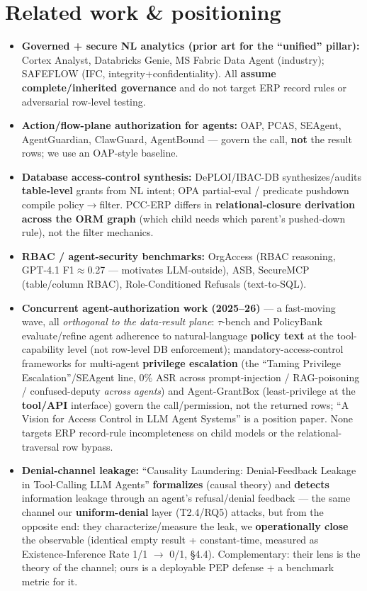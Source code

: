 \documentclass[11pt,a4paper]{article}
\begin{document}
\section{Related work \& positioning}
\begin{itemize}[leftmargin=*]
  \item \textbf{Governed + secure NL analytics (prior art for the ``unified'' pillar):} Cortex Analyst,
        Databricks Genie, MS Fabric Data Agent (industry); SAFEFLOW (IFC, integrity+confidentiality). All
        \textbf{assume complete/inherited governance} and do not target ERP record rules or adversarial
        row-level testing.
  \item \textbf{Action/flow-plane authorization for agents:} OAP, PCAS, SEAgent, AgentGuardian, ClawGuard,
        AgentBound --- govern the call, \textbf{not} the result rows; we use an OAP-style baseline.
  \item \textbf{Database access-control synthesis:} DePLOI/IBAC-DB synthesizes/audits \textbf{table-level}
        grants from NL intent; OPA partial-eval / predicate pushdown compile policy$\to$filter. PCC-ERP differs
        in \textbf{relational-closure derivation across the ORM graph} (which child needs which parent's
        pushed-down rule), not the filter mechanics.
  \item \textbf{RBAC / agent-security benchmarks:} OrgAccess (RBAC reasoning, GPT-4.1 F1$\approx$0.27 ---
        motivates LLM-outside), ASB, SecureMCP (table/column RBAC), Role-Conditioned Refusals (text-to-SQL).
  \item \textbf{Concurrent agent-authorization work (2025--26)} --- a fast-moving wave, all \emph{orthogonal
        to the data-result plane}: $\tau$-bench and PolicyBank evaluate/refine agent adherence to
        natural-language \textbf{policy text} at the tool-capability level (not row-level DB enforcement);
        mandatory-access-control frameworks for multi-agent \textbf{privilege escalation} (the ``Taming
        Privilege Escalation''/SEAgent line, 0\% ASR across prompt-injection / RAG-poisoning / confused-deputy
        \emph{across agents}) and Agent-GrantBox (least-privilege at the \textbf{tool/API} interface) govern
        the call/permission, not the returned rows; ``A Vision for Access Control in LLM Agent Systems'' is a
        position paper. None targets ERP record-rule incompleteness on child models or the relational-traversal
        row bypass.
  \item \textbf{Denial-channel leakage:} ``Causality Laundering: Denial-Feedback Leakage in Tool-Calling LLM
        Agents'' \textbf{formalizes} (causal theory) and \textbf{detects} information leakage through an
        agent's refusal/denial feedback --- the same channel our \textbf{uniform-denial} layer (T2.4/RQ5)
        attacks, but from the opposite end: they characterize/measure the leak, we \textbf{operationally
        close} the observable (identical empty result + constant-time, measured as Existence-Inference Rate
        1/1 $\to$ 0/1, \S4.4). Complementary: their lens is the theory of the channel; ours is a deployable PEP
        defense + a benchmark metric for it.
\end{itemize}
\end{document}
